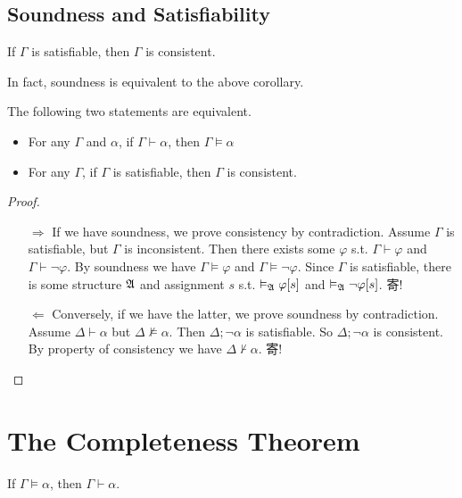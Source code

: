\subsection{Soundness and Satisfiability}

\begin{corollary}
    If $\Gamma$ is satisfiable, then $\Gamma$ is consistent.
\end{corollary}

In fact, soundness is equivalent to the above corollary.

\begin{theorem}
    The following two statements are equivalent.
    \begin{itemize}
        \item For any $\Gamma$ and $\alpha$, if $\Gamma\vdash\alpha$, then $\Gamma\vDash\alpha$
        \item For any $\Gamma$, if $\Gamma$ is satisfiable, then $\Gamma$ is consistent.
    \end{itemize}
\end{theorem}
\begin{proof}
    \begin{itemize}
        \item[$\Rightarrow$] If we have soundness, we prove consistency by contradiction. Assume $\Gamma$ is satisfiable, but $\Gamma$ is inconsistent. Then there exists some $\varphi$ s.t. $\Gamma\vdash\varphi$ and $\Gamma\vdash\neg\varphi$. By soundness we have $\Gamma\vDash\varphi$ and $\Gamma\vDash\neg\varphi$. Since $\Gamma$ is satisfiable, there is some structure $\mathfrak{A}$ and assignment $s$ s.t. $\vDash_{\mathfrak{A}}\varphi[s]$ and $\vDash_{\mathfrak{A}}\neg\varphi[s]$. 寄!
        \item[$\Leftarrow$] Conversely, if we have the latter, we prove soundness by contradiction. Assume $\Delta\vdash\alpha$ but $\Delta\nvDash\alpha$. Then $\Delta;\neg\alpha$ is satisfiable. So $\Delta;\neg\alpha$ is consistent. By property of consistency we have $\Delta\nvdash\alpha$. 寄!
    \end{itemize}
\end{proof}

\section{The Completeness Theorem}

\begin{theorem}
    If $\Gamma\vDash\alpha$, then $\Gamma\vdash\alpha$.
\end{theorem}

